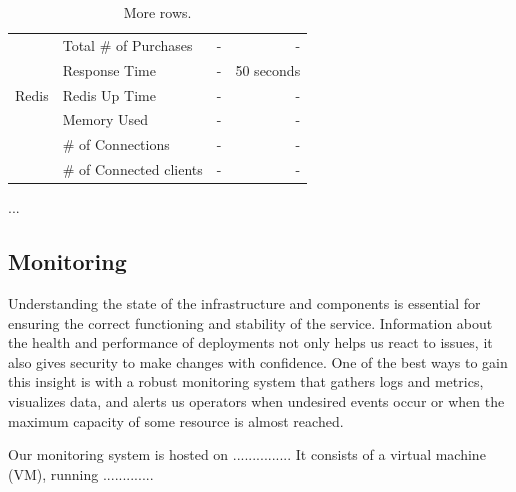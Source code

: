 \documentclass[12pt]{article}
\begin{document}
\begin{table}[h!]
\begin{center}
\begin{tabular}{l|l|r|r}
                          & Total \# of Purchases   & -                         & -                         \\
                          & Response Time           & -                         & 50 seconds                \\
      \hline
      Redis               & Redis Up Time           & -                         & -                         \\
                          & Memory Used             & -                         & -                         \\
                          & \# of Connections       & -                         & -                         \\
                          & \# of Connected clients & -                         & -                         \\
      \hline
    \end{tabular}
    \caption{More rows.}
    \label{tab:table1}
  \end{center}
\end{table}

...

\subsection{Monitoring} \label{management.monitoring} %


Understanding the state of the infrastructure and components is essential for ensuring the correct functioning and stability of the service.
Information about the health and performance of deployments not only helps us react to issues, it also gives security to make changes with confidence. 
One of the best ways to gain this insight is with a robust monitoring system that gathers logs and metrics, visualizes data, and alerts us operators when 
undesired events occur or when the maximum capacity of some resource is almost reached.

Our monitoring system is hosted on ............... %
It consists of a virtual machine (VM), running ............. %
\end{document}
